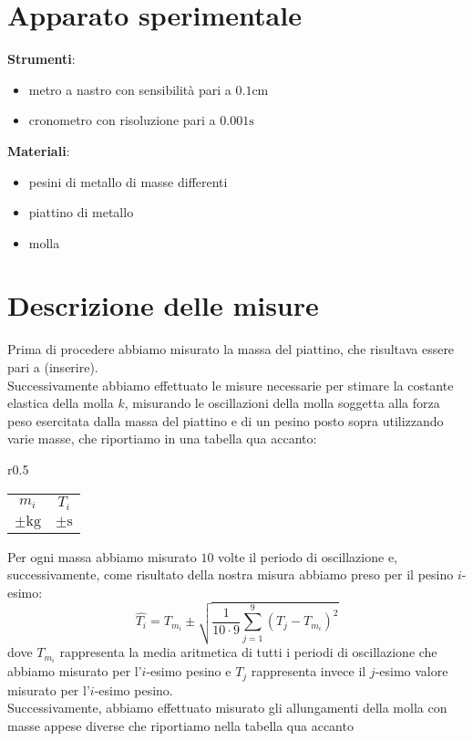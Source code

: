 \documentclass{article}
\begin{document}
	\section{Apparato sperimentale}
	\textbf{Strumenti}:
	\begin{itemize}
		\item metro a nastro con sensibilità pari a $0.1 \si{\centi\meter}$
		\item cronometro con risoluzione pari a $0.001 \si{\second}$
	\end{itemize}		
	\textbf{Materiali}:
	\begin{itemize}	
		\item pesini di metallo di masse differenti
		\item piattino di metallo
		\item molla
	\end{itemize}
	\section{Descrizione delle misure}
	Prima di procedere abbiamo misurato la massa del piattino, che risultava essere pari a (inserire). \\ Successivamente abbiamo effettuato le misure necessarie per stimare la costante elastica della molla $k$, misurando le oscillazioni della molla soggetta alla forza peso esercitata dalla massa del piattino e di un pesino posto sopra utilizzando varie masse, che riportiamo in una tabella qua accanto:
	
	\begin{wraptable}{r}{0.5\textwidth}
		\centering
		\begin{tabular}{c c}
		\toprule
		$m_i$ & $T_i$ \\
		$\pm \si{\kilo\gram}$ & $\pm \si{\second}$ \\
		\toprule
		

		\bottomrule		
		\end{tabular}
	\end{wraptable}
	\noindent Per ogni massa abbiamo misurato $10$ volte il periodo di oscillazione e, successivamente, come risultato della nostra misura abbiamo preso per il pesino $i$-esimo:
	$$
		\hat{T_i} = T_{m_i} \pm \sqrt{\frac{1}{10 \cdot 9} \sum_{j=1}^9 (T_j - T_{m_i})^2}
	$$
	dove $T_{m_i}$ rappresenta la media aritmetica di tutti i periodi di oscillazione che abbiamo misurato per l'$i$-esimo pesino e $T_j$ rappresenta invece il $j$-esimo valore misurato per l'$i$-esimo pesino. \\
	Successivamente, abbiamo effettuato misurato gli allungamenti della molla con masse appese diverse che riportiamo nella tabella qua accanto
\end{document}
